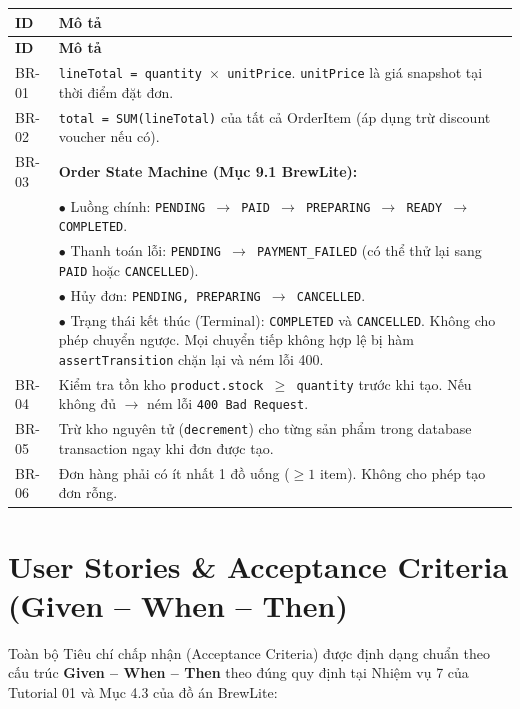 \documentclass[12pt,a4paper]{article}
\begin{document}
\begin{longtable}{|l|p{10cm}|}
\hline
\textbf{ID} & \textbf{Mô tả} \\
\hline
\endfirsthead
\hline
\textbf{ID} & \textbf{Mô tả} \\
\hline
\endhead

BR-01 & \texttt{lineTotal = quantity $\times$ unitPrice}. \texttt{unitPrice} là giá snapshot tại thời điểm đặt đơn. \\
\hline
BR-02 & \texttt{total = SUM(lineTotal)} của tất cả OrderItem (áp dụng trừ discount voucher nếu có). \\
\hline
BR-03 & \textbf{Order State Machine (Mục 9.1 BrewLite):} \\
& $\bullet$ Luồng chính: \texttt{PENDING $\to$ PAID $\to$ PREPARING $\to$ READY $\to$ COMPLETED}. \\
& $\bullet$ Thanh toán lỗi: \texttt{PENDING $\to$ PAYMENT\_FAILED} (có thể thử lại sang \texttt{PAID} hoặc \texttt{CANCELLED}). \\
& $\bullet$ Hủy đơn: \texttt{PENDING, PREPARING $\to$ CANCELLED}. \\
& $\bullet$ Trạng thái kết thúc (Terminal): \texttt{COMPLETED} và \texttt{CANCELLED}. Không cho phép chuyển ngược. Mọi chuyển tiếp không hợp lệ bị hàm \texttt{assertTransition} chặn lại và ném lỗi 400. \\
\hline
BR-04 & Kiểm tra tồn kho \texttt{product.stock $\geq$ quantity} trước khi tạo. Nếu không đủ $\to$ ném lỗi \texttt{400 Bad Request}. \\
\hline
BR-05 & Trừ kho nguyên tử (\texttt{decrement}) cho từng sản phẩm trong database transaction ngay khi đơn được tạo. \\
\hline
BR-06 & Đơn hàng phải có ít nhất 1 đồ uống ($\geq 1$ item). Không cho phép tạo đơn rỗng. \\
\hline
\end{longtable}

\section{User Stories \& Acceptance Criteria (Given -- When -- Then)}

Toàn bộ Tiêu chí chấp nhận (Acceptance Criteria) được định dạng chuẩn theo cấu trúc \textbf{Given -- When -- Then} theo đúng quy định tại Nhiệm vụ 7 của Tutorial 01 và Mục 4.3 của đồ án BrewLite:
\end{document}
